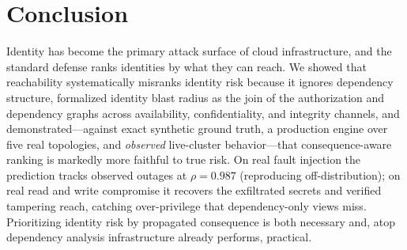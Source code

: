 \documentclass[conference]{IEEEtran}
\begin{document}
\section{Conclusion}
Identity has become the primary attack surface of cloud infrastructure, and the
standard defense ranks identities by what they can reach. We showed that reachability
systematically misranks identity risk because it ignores dependency structure,
formalized identity blast radius as the join of the authorization and dependency graphs
across availability, confidentiality, and integrity channels, and demonstrated---against
exact synthetic ground truth, a production engine over five real topologies, and
\emph{observed} live-cluster behavior---that consequence-aware ranking is markedly more
faithful to true risk. On real fault injection the prediction tracks observed outages at
$\rho=0.987$ (reproducing off-distribution); on real read and write compromise it recovers
the exfiltrated secrets and verified tampering reach, catching over-privilege that
dependency-only views miss. Prioritizing identity risk by propagated consequence is both necessary and, atop
dependency analysis infrastructure already performs, practical.
\end{document}
